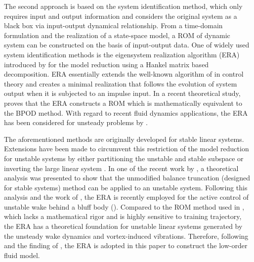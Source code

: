 \documentclass{jfm}
\begin{document}
%
The second approach is based on the system identification method, which  only requires 
input and output information and considers the original system as a black box via input-output 
dynamical relationship. From a time-domain formulation and the realization of a state-space 
model, a ROM of dynamic system can be constructed on the basis of input-output data.
%
One of widely used system identification methods is the eigensystem realization algorithm (ERA)
introduced by \cite{Juang1985} for the model reduction using a 
Hankel matrix based decomposition.
ERA essentially extends the well-known algorithm of \cite{HoKalman1966} in control theory  
and creates a minimal realization that follows the evolution of system output 
when it is subjected to an impulse input.
%
In a recent theoretical study, \cite{Ma2011} proves that 
the ERA constructs a ROM which is mathematically equivalent to the BPOD method. 
With regard to recent fluid dynamics applications, the ERA has been considered for unsteady problems by \cite{Flinois2016,Yao2015}.

The aforementioned methods are originally developed for stable linear systems. 
%
Extensions  have been made to circumvent this restriction 
of the model reduction for unstable systems by either 
partitioning the unstable and stable subspace or inverting the large linear system 
\citep{barbagallo2009,Ahuja2010,Dergham2011}.
%
In one of the recent work by \cite{Flinois2015}, 
a theoretical analysis was presented to show 
that the unmodified balance truncation (designed for stable systems)
method can be applied to an unstable system.
%
Following this analysis and the work of \cite{Ma2011}, the ERA is recently employed 
for the active control of unstable wake behind a bluff body (\cite{Flinois2016}). 
Compared to the ROM method used in \cite{Zhang2015}, 
which lacks a mathematical rigor and is highly sensitive to training trajectory, 
the ERA has a theoretical foundation for unstable linear systems generated by 
the unsteady wake dynamics and vortex-induced vibrations. 
Therefore, following \cite{Flinois2015} and the finding of \cite{Ma2011}, 
the ERA is adopted in this paper to construct the low-order fluid model.
\end{document}
